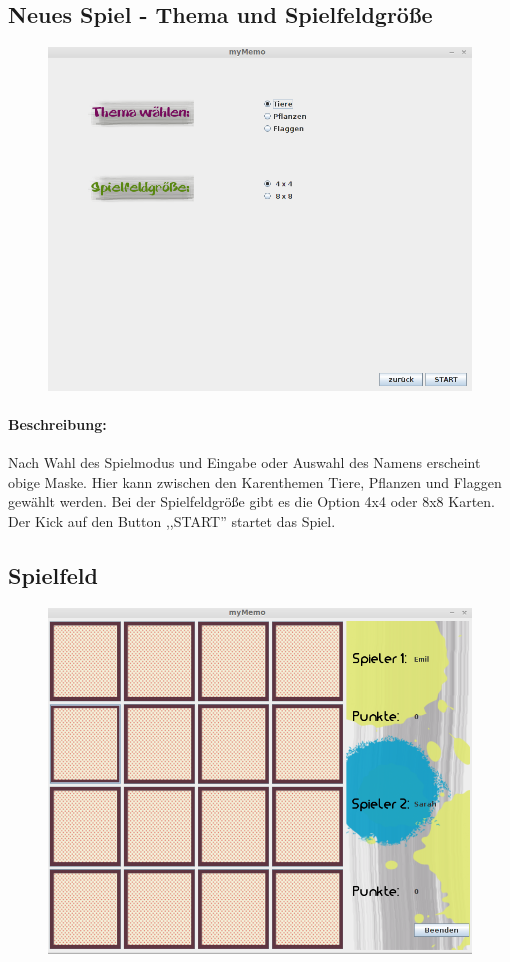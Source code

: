 \subsection{Neues Spiel - Thema und Spielfeldgröße}
\begin{figure}[!h]
	\centering
    \includegraphics[width=\textwidth]{./guiTiere.png}
	\label{}
\end{figure}
\paragraph{Beschreibung: }Nach Wahl des Spielmodus und Eingabe oder Auswahl des Namens erscheint obige Maske. Hier kann zwischen den Karenthemen Tiere, Pflanzen und Flaggen gewählt werden. Bei der Spielfeldgröße gibt es die Option 4x4 oder 8x8 Karten. Der Kick auf den Button ,,START'' startet das Spiel.


\clearpage
\subsection{Spielfeld}
\begin{figure}[!h]
	\centering
    \includegraphics[width=\textwidth]{./guiSpielfeld.png}
	\label{}
\end{figure}
